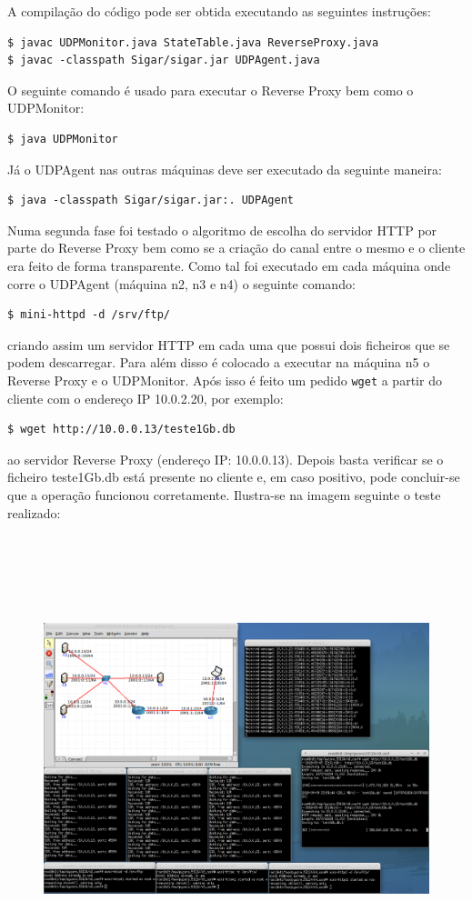 \documentclass{article}
\begin{document}
A compilação do código pode ser obtida executando as seguintes instruções:
\begin{verbatim}
$ javac UDPMonitor.java StateTable.java ReverseProxy.java
$ javac -classpath Sigar/sigar.jar UDPAgent.java
\end{verbatim}
O seguinte comando é usado para executar o Reverse Proxy bem como o UDPMonitor:
\begin{verbatim}
$ java UDPMonitor
\end{verbatim}
Já o UDPAgent nas outras máquinas deve ser executado da seguinte maneira:
\begin{verbatim}
$ java -classpath Sigar/sigar.jar:. UDPAgent
\end{verbatim}

Numa segunda fase foi testado o algoritmo de escolha do servidor HTTP por parte do Reverse Proxy bem como se a criação do canal entre o mesmo e o cliente era feito de forma transparente.
Como tal foi executado em cada máquina onde corre o UDPAgent (máquina n2, n3 e n4) o seguinte comando:
\begin{verbatim}
$ mini-httpd -d /srv/ftp/
\end{verbatim}
criando assim um servidor HTTP em cada uma que possui dois ficheiros que se podem descarregar. Para além disso é colocado a executar na máquina n5 o Reverse Proxy e o UDPMonitor.
Após isso é feito um pedido \texttt{wget} a partir do cliente com o endereço IP 10.0.2.20, por exemplo:
\begin{verbatim}
$ wget http://10.0.0.13/teste1Gb.db
\end{verbatim}
ao servidor Reverse Proxy (endereço IP: 10.0.0.13). Depois basta verificar se o ficheiro teste1Gb.db está presente no cliente e, em caso positivo, pode concluir-se que a operação funcionou corretamente. Ilustra-se na imagem seguinte o teste realizado:
\begin{figure}[H]
	\advance\leftskip-3cm
    \includegraphics[height=13cm]{teste2.png}
\end{figure}
\end{document}
